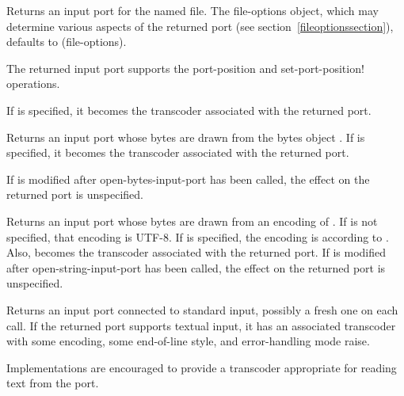 \begin{entry}{%
}
   
Returns an input port for the named file. The file-options object,
which may determine
various aspects of the returned port (see section~\ref{fileoptionssection}),
defaults to {\cf (file-options)}.

The returned input port supports the {\cf port-position} and {\cf
  set-port-position!}  operations.

If  is specified, it becomes the transcoder associated
with the returned port.
\end{entry}

\begin{entry}{%
}
   
Returns an input port whose bytes are drawn from the
bytes object .
If  is specified, it becomes the transcoder associated
with the returned port.

If  is modified after {\cf open-bytes-input-port}
has been called, the effect on the returned
port is unspecified.
\end{entry}

\begin{entry}{%
}

Returns an input port whose bytes are drawn from an encoding of
.  If  is not specified, that encoding is
UTF-8.  If  is specified, the encoding is according to
.  Also,  becomes the transcoder
associated with the returned port.
If  is modified after {\cf open-string-input-port}
has been called, the effect on the returned port is unspecified.
\end{entry}

\begin{entry}{%
}
   
Returns an input port connected to standard input, possibly a fresh
one on each call.  If the returned port supports textual input, it has
an associated transcoder with some encoding, some end-of-line style,
and error-handling mode {\cf raise}.

\begin{note}
  Implementations are encouraged to provide a transcoder appropriate
  for reading text from the port.
\end{note}
\end{entry}

